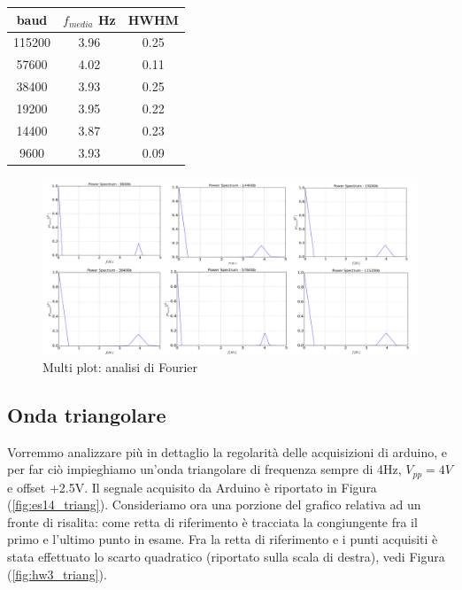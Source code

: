 \documentclass[journal, a4paper]{IEEEtran}
\begin{document}
\begin{table}
\centering
\begin{tabular}{c|c|c}
\hline \textbf{baud} & $ f_{media}$ Hz & \textbf{HWHM} \\ 
\hline 115200 & 3.96 & 0.25 \\ 
57600 & 4.02 & 0.11 \\ 
38400 & 3.93 & 0.25 \\ 
19200 & 3.95 & 0.22 \\ 
14400 & 3.87 & 0.23 \\ 
9600 & 3.93 & 0.09 \\ 
\hline 
\end{tabular} 
\end{table}


\begin{figure}
\centering
\includegraphics[width=1.1\linewidth]{./multi_fft2}
\caption{Multi plot: analisi di Fourier}
\label{fig:multi_fft2}
\end{figure}


\subsection{Onda triangolare}
Vorremmo analizzare più in dettaglio la regolarità delle acquisizioni di arduino, e per far ciò impieghiamo un'onda triangolare di frequenza sempre di 4Hz, $V_{pp} = 4V$ e offset +2.5V. Il segnale acquisito da Arduino è riportato in Figura (\ref{fig:es14_triang}). Consideriamo ora una porzione del grafico relativa ad un fronte di risalita: come retta di riferimento è tracciata la congiungente fra il primo e l'ultimo punto in esame. Fra la retta di riferimento e i punti acquisiti è stata effettuato lo scarto quadratico (riportato sulla scala di destra), vedi Figura (\ref{fig:hw3_triang}).\\
\end{document}
